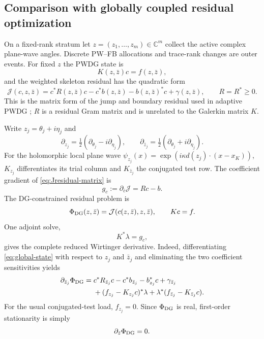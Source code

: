 \documentclass[11pt]{article}
\newcommand{\ii}{i}
\newcommand{\C}{\mathbb{C}}
\newcommand{\Jfun}{\mathcal J}
\numberwithin{equation}{section}
\begin{document}
\subsection{Comparison with globally coupled residual optimization}\label{sec:global-residual}
On a fixed-rank stratum let $z=(z_1,\ldots,z_m)\in\C^m$ collect the active complex plane-wave angles.  Discrete PW--FB allocations and trace-rank changes are outer events.  For fixed $z$ the PWDG state is
\begin{equation}\label{eq:global-state}
 K(z,\bar z)c=f(z,\bar z),
\end{equation}
and the weighted skeleton residual has the quadratic form
\begin{equation}\label{eq:Jresidual-matrix}
 \Jfun(c,z,\bar z)=c^*R(z,\bar z)c-c^*b(z,\bar z)-b(z,\bar z)^*c+\gamma(z,\bar z),
 \qquad R=R^*\ge0.
\end{equation}
This is the matrix form of the jump and boundary residual used in adaptive PWDG \citep{KapitaMonkWarburton2015,Kapita2026Directions}; $R$ is a residual Gram matrix and is unrelated to the Galerkin matrix $K$.

Write $z_j=\theta_j+\ii\eta_j$ and
\[
 \partial_{z_j}=\tfrac12(\partial_{\theta_j}-\ii\partial_{\eta_j}),
 \qquad
 \partial_{\bar z_j}=\tfrac12(\partial_{\theta_j}+\ii\partial_{\eta_j}).
\]
For the holomorphic local plane wave $\psi_{z_j}(x)=\exp(\ii\kappa d(z_j)\cdot(x-x_K))$, $K_{z_j}$ differentiates its trial column and $K_{\bar z_j}$ the conjugated test row.  The coefficient gradient of \eqref{eq:Jresidual-matrix} is
\begin{equation}\label{eq:wirtinger-c}
 g_c:=\partial_{\bar c}\Jfun=Rc-b.
\end{equation}
The DG-constrained residual problem is
\begin{equation}\label{eq:constrained-opt}
 \Phi_{\rm DG}(z,\bar z)=\Jfun(c(z,\bar z),z,\bar z),
 \qquad Kc=f.
\end{equation}
One adjoint solve,
\begin{equation}\label{eq:wirtinger-adjoint}
 K^*\lambda=g_c,
\end{equation}
gives the complete reduced Wirtinger derivative.  Indeed, differentiating \eqref{eq:global-state} with respect to $z_j$ and $\bar z_j$ and eliminating the two coefficient sensitivities yields
\begin{align}\label{eq:wirtinger-global-gradient}
 \partial_{\bar z_j}\Phi_{\rm DG}
 ={}&c^*R_{\bar z_j}c-c^*b_{\bar z_j}-b_{z_j}^*c+\gamma_{\bar z_j}\nonumber\\
 &+(f_{z_j}-K_{z_j}c)^*\lambda
   +\lambda^*(f_{\bar z_j}-K_{\bar z_j}c).
\end{align}
For the usual conjugated-test load, $f_{z_j}=0$.  Since $\Phi_{\rm DG}$ is real, first-order stationarity is simply
\begin{equation}\label{eq:wirtinger-stationarity}
 \partial_{\bar z}\Phi_{\rm DG}=0.
\end{equation}
\end{document}
